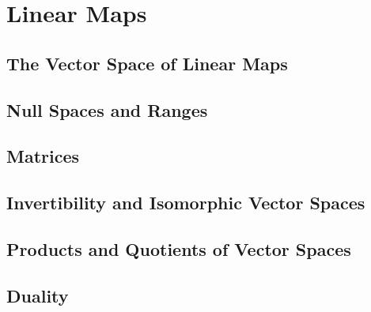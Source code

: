 \chapter{Linear Maps}

\section{The Vector Space of Linear Maps}

\section{Null Spaces and Ranges}

\section{Matrices}

\section{Invertibility and Isomorphic Vector Spaces}

\section{Products and Quotients of Vector Spaces}

\section{Duality}

